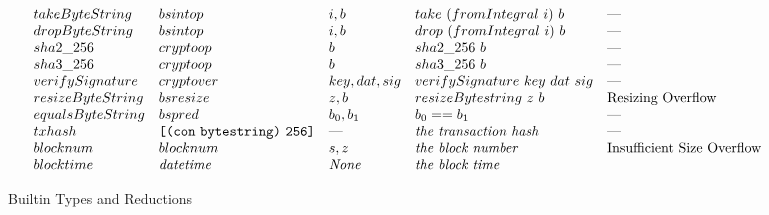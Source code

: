 \documentclass[../main.tex]{subfiles}
\begin{document}
\begin{figure*}[t]
\[\begin{array}{lllll}
        takeByteString    &   bsintop   &   i, b     & take ~ (fromIntegral ~ i) ~ b   &   \textrm{---} \\
        dropByteString    &   bsintop   &   i, b     & drop ~ (fromIntegral ~ i) ~ b   &   \textrm{---} \\
        
        sha2\_256         &  cryptoop  &   b           & sha2\_256 ~ b    & \textrm{---}                \\
        sha3\_256         &  cryptoop  &   b           & sha3\_256~ b     & \textrm{---}                \\
        
        verifySignature   &  cryptover  &   key, dat, sig           & verifySignature ~ key ~ dat ~ sig   &   \textrm{---}          \\
        
        resizeByteString   &   bsresize   &   z, b   &   resizeBytestring ~ z ~ b   &   \textrm{Resizing Overflow} \\
        
        equalsByteString  &   bspred   &   b_0 , b_1   & b_0 == b_1   &   \textrm{---}  \\
        
        txhash   &   \texttt{[} \texttt{(} \texttt{con} ~ \texttt{bytestring} \texttt{)} ~ \texttt{256} \texttt{]}   &   \textrm{---}  & \textit{the transaction hash}   &   \textrm{---}  \\
        
        blocknum  &  blocknum  & s, z & \textit{the block number}   &   \textrm{Insufficient Size Overflow}  \\
        
        blocktime &  \mathit{datetime}  &  \textit{None}  & \textit{the block time}   &   \textrm{}  \\
    \end{array}\]
    
    \caption{Builtin Types and Reductions}
    \label{fig:Plutus_core_builtins}
\end{figure*}

\normalsize
\end{document}

